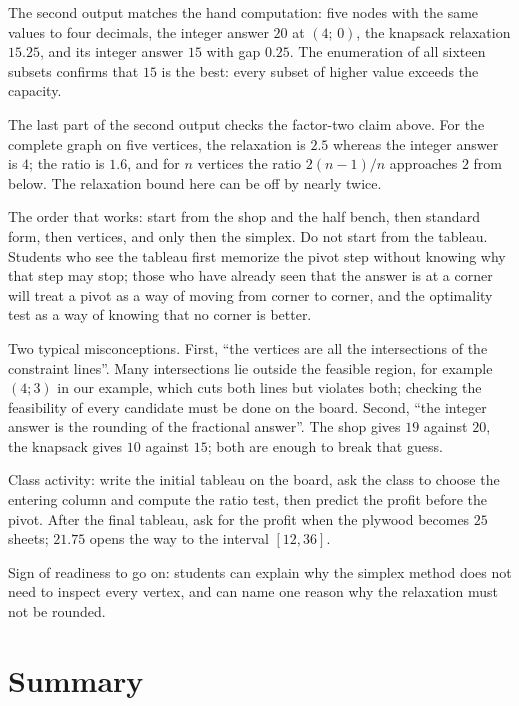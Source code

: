 The second output matches the hand computation: five nodes with the same values to four
decimals, the integer answer $20$ at $(4;\,0)$, the knapsack relaxation $15.25$, and its integer
answer $15$ with gap $0.25$. The enumeration of all sixteen subsets confirms that $15$ is the
best: every subset of higher value exceeds the capacity.

The last part of the second output checks the factor-two claim above. For the complete graph on
five vertices, the relaxation is $2.5$ whereas the integer answer is $4$; the ratio is $1.6$,
and for $n$ vertices the ratio $2(n-1)/n$ approaches $2$ from below. The relaxation bound here
can be off by nearly twice.

\begin{untukdosen}
The order that works: start from the shop and the half bench, then standard form, then vertices,
and only then the simplex. Do not start from the tableau. Students who see the tableau first
memorize the pivot step without knowing why that step may stop; those who have already seen that
the answer is at a corner will treat a pivot as a way of moving from corner to corner, and the
optimality test as a way of knowing that no corner is better.

Two typical misconceptions. First, ``the vertices are all the intersections of the constraint
lines''. Many intersections lie outside the feasible region, for example $(4;3)$ in our example,
which cuts both lines but violates both; checking the feasibility of every candidate must be
done on the board. Second, ``the integer answer is the rounding of the fractional answer''. The
shop gives $19$ against $20$, the knapsack gives $10$ against $15$; both are enough to break
that guess.

Class activity: write the initial tableau on the board, ask the class to choose the entering
column and compute the ratio test, then predict the profit before the pivot. After the final
tableau, ask for the profit when the plywood becomes $25$ sheets; $21.75$ opens the way to the
interval $[12,36]$.

Sign of readiness to go on: students can explain why the simplex method does not need to inspect
every vertex, and can name one reason why the relaxation must not be rounded.
\end{untukdosen}

\section{Summary}

